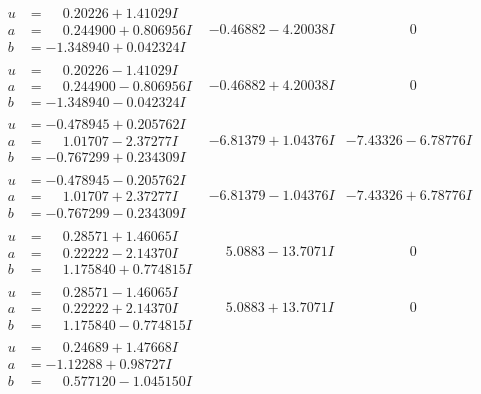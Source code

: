 \documentclass[1p]{elsarticle_modified}
\theoremstyle{definition}
\begin{document}
$$\begin{array}{c|c|c}
\begin{aligned}
u &= \phantom{-}0.20226 + 1.41029 I \\
a &= \phantom{-}0.244900 + 0.806956 I \\
b &= -1.348940 + 0.042324 I\end{aligned}
 & -0.46882 - 4.20038 I & \phantom{-0.000000 } 0 \\ \hline\begin{aligned}
u &= \phantom{-}0.20226 - 1.41029 I \\
a &= \phantom{-}0.244900 - 0.806956 I \\
b &= -1.348940 - 0.042324 I\end{aligned}
 & -0.46882 + 4.20038 I & \phantom{-0.000000 } 0 \\ \hline\begin{aligned}
u &= -0.478945 + 0.205762 I \\
a &= \phantom{-}1.01707 - 2.37277 I \\
b &= -0.767299 + 0.234309 I\end{aligned}
 & -6.81379 + 1.04376 I & -7.43326 - 6.78776 I \\ \hline\begin{aligned}
u &= -0.478945 - 0.205762 I \\
a &= \phantom{-}1.01707 + 2.37277 I \\
b &= -0.767299 - 0.234309 I\end{aligned}
 & -6.81379 - 1.04376 I & -7.43326 + 6.78776 I \\ \hline\begin{aligned}
u &= \phantom{-}0.28571 + 1.46065 I \\
a &= \phantom{-}0.22222 - 2.14370 I \\
b &= \phantom{-}1.175840 + 0.774815 I\end{aligned}
 & \phantom{-}5.0883 - 13.7071 I & \phantom{-0.000000 } 0 \\ \hline\begin{aligned}
u &= \phantom{-}0.28571 - 1.46065 I \\
a &= \phantom{-}0.22222 + 2.14370 I \\
b &= \phantom{-}1.175840 - 0.774815 I\end{aligned}
 & \phantom{-}5.0883 + 13.7071 I & \phantom{-0.000000 } 0 \\ \hline\begin{aligned}
u &= \phantom{-}0.24689 + 1.47668 I \\
a &= -1.12288 + 0.98727 I \\
b &= \phantom{-}0.577120 - 1.045150 I\end{aligned}

\end{array}$$
\end{document}
